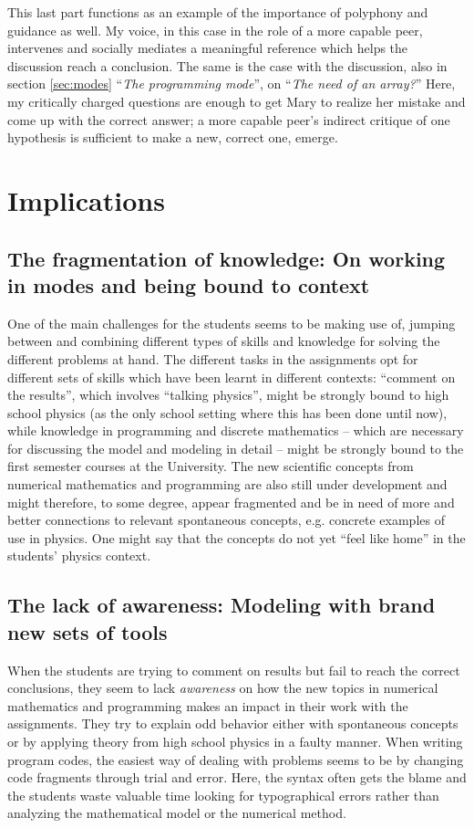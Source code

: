 \documentclass[aps,prb,floatfix,twocolumn,twoside,english]{revtex4-1}
\begin{document}
This last part functions as an example of the importance of polyphony and guidance as well. My voice, in this case in the role of a more capable peer, intervenes and socially mediates a meaningful reference which helps the discussion reach a conclusion. The same is the case with the discussion, also in section \ref{sec:modes} ``\textit{The programming mode}'', on ``\textit{The need of an array?}'' Here, my critically charged questions are enough to get Mary to realize her mistake and come up with the correct answer; a more capable peer's indirect critique of one hypothesis is sufficient to make a new, correct one, emerge.


\section{Implications}
\label{sec:implications}
\subsection{The fragmentation of knowledge: On working in modes and being bound to context}

One of the main challenges for the students seems to be making use of, jumping between and combining different types of skills and knowledge for solving the different problems at hand. The different tasks in the assignments opt for different sets of skills which have been learnt in different contexts: ``comment on the results'', which involves ``talking physics'', might be strongly bound to high school physics (as the only school setting where this has been done until now), while knowledge in programming and discrete mathematics -- which are necessary for discussing the model and modeling in detail -- might be strongly bound to the first semester courses at the University. The new scientific concepts from numerical mathematics and programming are also still under development and might therefore, to some degree, appear fragmented and be in need of more and better connections to relevant spontaneous concepts, e.g. concrete examples of use in physics. One might say that the concepts do not yet ``feel like home'' in the students' physics context.


\subsection{The lack of awareness: Modeling with brand new sets of tools}

When the students are trying to comment on results but fail to reach the correct conclusions, they seem to lack \textit{awareness} on how the new topics in numerical mathematics and programming makes an impact in their work with the assignments. They try to explain odd behavior either with spontaneous concepts or by applying theory from high school physics in a faulty manner. When writing program codes, the easiest way of dealing with problems seems to be by changing code fragments through trial and error. Here, the syntax often gets the blame and the students waste valuable time looking for typographical errors rather than analyzing the mathematical model or the numerical method.
\end{document}
